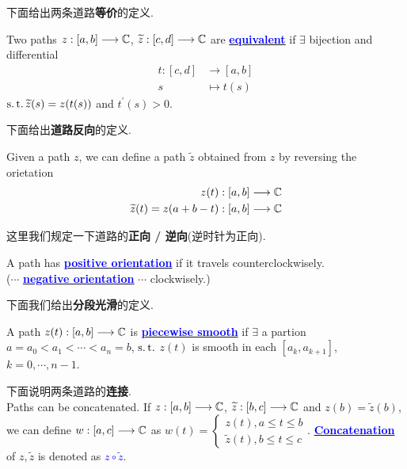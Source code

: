 	\vspace{2em}
	下面给出两条道路\textbf{等价}的定义.
	\begin{defn}
		Two paths $z : [a , b] \longrightarrow \mathbb{C}$, $\widetilde{z} : [c, d] \longrightarrow \mathbb{C}$ are \underline{\textcolor{blue}{\textbf{equivalent}}} if $\exists$ bijection and differential
		\begin{align}
			t : [c , d] &\longrightarrow [a , b] \\
			s &\longmapsto t(s)
		\end{align}
		$\operatorname{s.t.} \widetilde{z}(s) = z(t(s))$ and $t^{'}(s) > 0$.
	\end{defn}

	\vspace{2em}
	下面给出\textbf{道路反向}的定义.
	\begin{defn}\label{def 3.4.4}
		Given a path $z$, we can define a path $\widetilde{z}$ obtained from $z$ by reversing the orietation
		\begin{align}
			z(t) &: [a , b] \longrightarrow \mathbb{C} \\
			\widetilde{z}(t) = z(a + b - t) &: [a , b] \longrightarrow \mathbb{C}
		\end{align}
	\end{defn}
	
	\newpage
	这里我们规定一下道路的\textbf{正向 / 逆向}(逆时针为正向).
	\begin{defn}\label{def 3.4.5}
		A path has \underline{\textcolor{blue}{\textbf{positive orientation}}} if it travels counterclockwisely.\\
		($\cdots$ \underline{\textcolor{blue}{\textbf{negative orientation}}} $\cdots$ clockwisely.)
	\end{defn}

	\vspace{2em}
	下面我们给出\textbf{分段光滑}的定义.
	\begin{defn}\label{def 3.4.6}
		A path $z(t) : [a , b] \longrightarrow \mathbb{C}$ is \underline{\textcolor{blue}{\textbf{piecewise smooth}}} if $\exists$ a partion $a = a_0 < a_1 < \cdots < a_n = b$, $\operatorname{s.t.}$ $z(t)$ is smooth in each $[a_k , a_{k + 1}]$, $k = 0 , \cdots , n - 1$.
	\end{defn}

	\vspace{2em}
	下面说明两条道路的\textbf{连接}.\\
	Paths can be concatenated. If $z : [a , b] \longrightarrow \mathbb{C}$, $\widetilde{z} : [b , c] \longrightarrow \mathbb{C}$ and $z(b) = \widetilde{z}(b)$, we can define $w : [a , c] \longrightarrow \mathbb{C}$ as $w(t) = 
	\begin{cases}
		z(t) , a \leq t \leq b\\
		\widetilde{z}(t) , b \leq t \leq c
	\end{cases}$.
	\underline{\textcolor{blue}{\textbf{Concatenation}}} of $z , \widetilde{z}$ is denoted as \textcolor{blue}{$z \circ \widetilde{z}$}.\\
	
